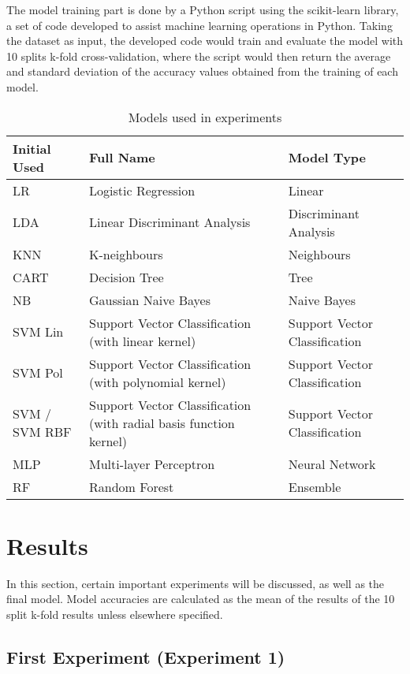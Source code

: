 \documentclass{report}
\begin{document}
The model training part is done by a Python script using the scikit-learn library, a set of code developed to assist machine learning operations in Python. Taking the dataset as input, the developed code would train and evaluate the model with 10 splits k-fold cross-validation, where the script would then return the average and standard deviation of the accuracy values obtained from the training of each model.

\begin{table}[h!]
\centering
\begin{tabular}{lm{13em}l}
\hline
Initial Used & Full Name & Model Type \\
\hline
LR & Logistic Regression & Linear \\
LDA & Linear Discriminant Analysis & Discriminant Analysis \\
KNN & K-neighbours & Neighbours \\
CART & Decision Tree & Tree \\
NB & Gaussian Naive Bayes & Naive Bayes \\
SVM Lin & Support Vector Classification (with linear kernel) & Support Vector Classification \\
SVM Pol & Support Vector Classification (with polynomial kernel) & Support Vector Classification \\
SVM / SVM RBF & Support Vector Classification (with radial basis function kernel) & Support Vector Classification \\
MLP & Multi-layer Perceptron & Neural Network \\
RF & Random Forest & Ensemble \\
\hline
\end{tabular}
\caption{Models used in experiments}
\label{table:3.2}
\end{table}

\section{Results}

In this section, certain important experiments will be discussed, as well as the final model. Model accuracies are calculated as the mean of the results of the 10 split k-fold results unless elsewhere specified.

\subsection{First Experiment (Experiment 1)}
\end{document}

